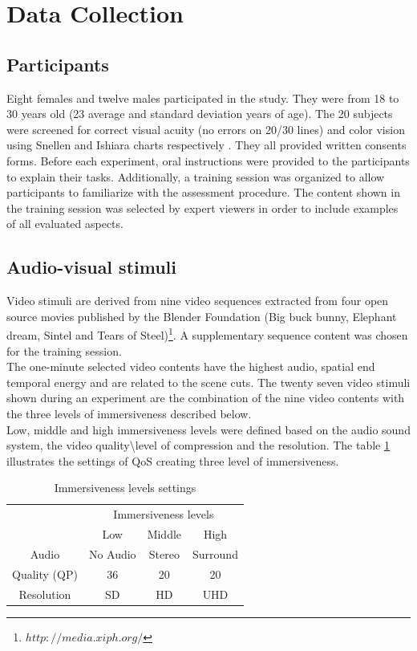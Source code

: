 \section{Data Collection}

\subsection{Participants}
Eight females and twelve males participated in the study. They were from 18 to 30 years old (23 average and standard deviation years of age). The 20 subjects were screened for correct visual acuity (no errors on 20/30 lines) and color vision using Snellen and Ishiara charts respectively \cite{ishihara1917test,songden2013colour}. They all provided written consents forms. Before each experiment, oral instructions were provided to the participants to explain their tasks. Additionally, a training session was organized to allow participants to familiarize with the assessment procedure. The content shown in the training session was selected by expert viewers in order to include examples of all evaluated aspects.

\subsection{Audio-visual stimuli}
Video stimuli are derived from nine video sequences extracted from four open source movies published by the Blender Foundation (Big buck bunny, Elephant dream, Sintel and Tears of Steel)\footnote{$http://media.xiph.org/$}. A supplementary sequence content was chosen for the training session.
\\The one-minute selected video contents have the highest audio, spatial end temporal energy and are related to the scene cuts.
The twenty seven video stimuli shown during an experiment are the combination of the nine video contents with the three levels of immersiveness described below.
\\Low, middle and high immersiveness levels were defined based on the audio sound system, the video quality\textbackslash level of compression and the resolution.
The table \ref{IL} illustrates the settings of \ac{QoS} creating three level of immersiveness.

\begin{table}[h]
\begin{tabular}{ |c || c | c | c | }
   \hline	
  						& \multicolumn{3}{c|}{Immersiveness levels} \\ \cline{2-4}
   					 	& Low 			& Middle 		& High \\
   \hline	
   Audio 				& No Audio 		& Stereo		& Surround \\
   Quality (QP) 		& 36 			& 20			& 20 \\
   Resolution			& SD			& HD			& UHD\\
   \hline	
 \end{tabular}
 \caption{Immersiveness levels settings}
 \label{IL}
 \end{table}

